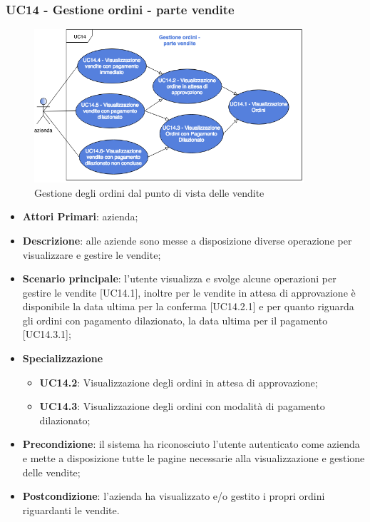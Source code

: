 \subsubsection{UC14 - Gestione ordini - parte vendite}
\begin{figure}[h]
	\includegraphics[width=10cm]{res/images/UC14ParteVendite.png}
	\centering
	\caption{Gestione degli ordini dal punto di vista delle vendite}
\end{figure}
\begin{itemize}
	\item \textbf{Attori Primari}: azienda;
	\item \textbf{Descrizione}: alle aziende sono messe a disposizione diverse operazione per visualizzare e gestire le vendite;
	\item \textbf{Scenario principale}: l'utente visualizza e svolge alcune operazioni per gestire le vendite [UC14.1], inoltre per le vendite in attesa di approvazione è disponibile la data ultima per la conferma [UC14.2.1] e per quanto riguarda gli ordini con pagamento dilazionato,  la data ultima per il pagamento [UC14.3.1];
	\item \textbf{Specializzazione}
	\begin{itemize}
		\item \textbf{UC14.2}: Visualizzazione degli ordini in attesa di approvazione;
		\item \textbf{UC14.3}: Visualizzazione degli ordini con modalità di pagamento dilazionato;
	\end{itemize}
	\item \textbf{Precondizione}: il sistema ha riconosciuto l'utente autenticato come azienda e mette a disposizione tutte le pagine necessarie alla visualizzazione e gestione delle vendite;
	\item \textbf{Postcondizione}: l'azienda ha visualizzato e/o gestito i propri ordini riguardanti le vendite.
\end{itemize} 
